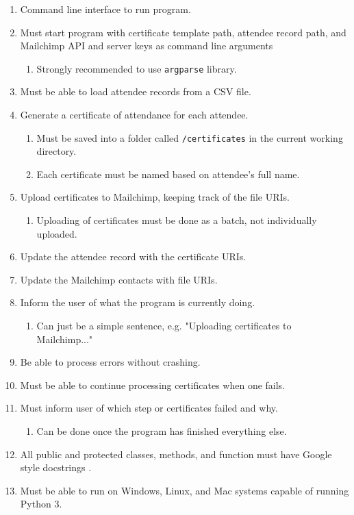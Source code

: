 \documentclass[11pt]{article}
\begin{document}
\begin{enumerate}
    \item Command line interface to run program.
    \item Must start program with certificate template path, attendee record path, and Mailchimp API and server keys as command line arguments
    \begin{enumerate}
        \item Strongly recommended to use \texttt{argparse} library.
    \end{enumerate}
    \item Must be able to load attendee records from a CSV file.
    \item Generate a certificate of attendance for each attendee.
    \begin{enumerate}
        \item Must be saved into a folder called \texttt{/certificates} in the current working directory.
        \item Each certificate must be named based on attendee's full name.
    \end{enumerate}
    \item Upload certificates to Mailchimp, keeping track of the file URIs.
    \begin{enumerate}
        \item Uploading of certificates must be done as a batch, not individually uploaded.
    \end{enumerate}
    \item Update the attendee record with the certificate URIs.
    \item Update the Mailchimp contacts with file URIs.
    \item Inform the user of what the program is currently doing.
    \begin{enumerate}
        \item Can just be a simple sentence, e.g. "Uploading certificates to Mailchimp..."
    \end{enumerate}
    \item Be able to process errors without crashing.
    \item Must be able to continue processing certificates when one fails.
    \item Must inform user of which step or certificates failed and why.
    \begin{enumerate}
        \item Can be done once the program has finished everything else.
    \end{enumerate}
    \item All public and protected classes, methods, and function must have Google style docstrings \cite{google-docstring}.
    \item Must be able to run on Windows, Linux, and Mac systems capable of running Python 3.
\end{enumerate}
\end{document}
